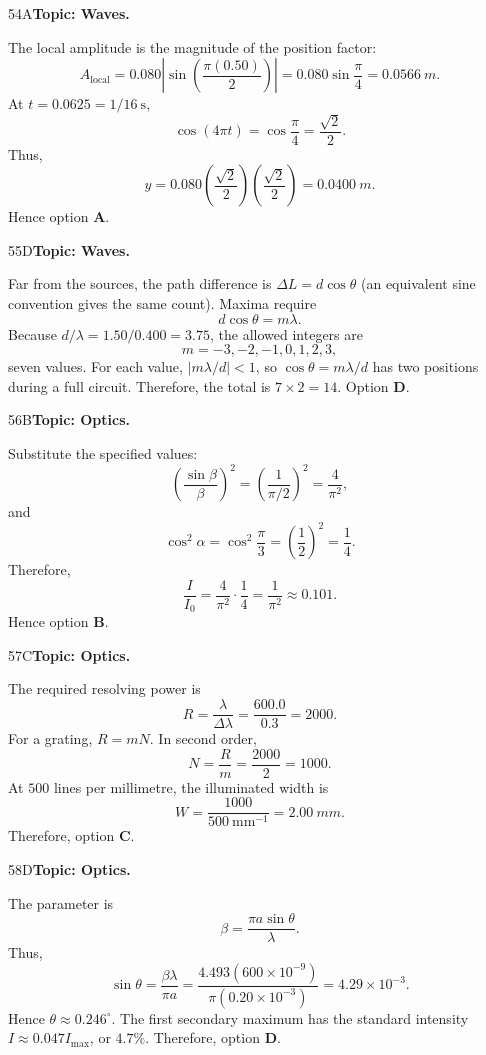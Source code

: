 \documentclass[10pt,a4paper]{physicsquiz}
\begin{document}
\begin{workedsolution}{54}{A}\textbf{Topic: Waves.}\par The local amplitude is the magnitude of the position factor:
  \[
    A_{\mathrm{local}}=0.080\left|\sin\left(\frac{\pi(0.50)}{2}\right)\right|
    =0.080\sin\frac{\pi}{4}
    =\SI{0.0566}{m}.
  \]
  At \(t=0.0625=1/16\ \mathrm{s}\),
  \[
    \cos(4\pi t)=\cos\frac{\pi}{4}=\frac{\sqrt2}{2}.
  \]
  Thus,
  \[
    y=0.080\left(\frac{\sqrt2}{2}\right)\left(\frac{\sqrt2}{2}\right)
    =\SI{0.0400}{m}.
  \]
  Hence option \textbf{A}.\end{workedsolution}
\begin{workedsolution}{55}{D}\textbf{Topic: Waves.}\par Far from the sources, the path difference is \(\Delta L=d\cos\theta\) (an equivalent sine convention gives the same count). Maxima require
  \[
    d\cos\theta=m\lambda.
  \]
  Because \(d/\lambda=1.50/0.400=3.75\), the allowed integers are
  \[
    m=-3,-2,-1,0,1,2,3,
  \]
  seven values. For each value, \(|m\lambda/d|<1\), so \(\cos\theta=m\lambda/d\) has two positions during a full circuit. Therefore, the total is \(7\times2=14\). Option \textbf{D}.\end{workedsolution}
\begin{workedsolution}{56}{B}\textbf{Topic: Optics.}\par Substitute the specified values:
  \[
    {\left(\frac{\sin\beta}{\beta}\right)}^2
    ={\left(\frac{1}{\pi/2}\right)}^2
    =\frac{4}{\pi^2},
  \]
  and
  \[
    \cos^2\alpha=\cos^2\frac{\pi}{3}={\left(\frac12\right)}^2=\frac14.
  \]
  Therefore,
  \[
    \frac{I}{I_0}=\frac{4}{\pi^2}\cdot\frac14=\frac{1}{\pi^2}\approx0.101.
  \]
  Hence option \textbf{B}.\end{workedsolution}
\begin{workedsolution}{57}{C}\textbf{Topic: Optics.}\par The required resolving power is
  \[
    R=\frac{\lambda}{\Delta\lambda}
    =\frac{600.0}{0.3}=2000.
  \]
  For a grating, \(R=mN\). In second order,
  \[
    N=\frac{R}{m}=\frac{2000}{2}=1000.
  \]
  At \(500\) lines per millimetre, the illuminated width is
  \[
    W=\frac{1000}{500\ \mathrm{mm}^{-1}}=\SI{2.00}{mm}.
  \]
  Therefore, option \textbf{C}.\end{workedsolution}
\begin{workedsolution}{58}{D}\textbf{Topic: Optics.}\par The parameter is
  \[
    \beta=\frac{\pi a\sin\theta}{\lambda}.
  \]
  Thus,
  \[
    \sin\theta=\frac{\beta\lambda}{\pi a}
    =\frac{4.493(600\times10^{-9})}{\pi(0.20\times10^{-3})}
    =4.29\times10^{-3}.
  \]
  Hence \(\theta\approx0.246^\circ\). The first secondary maximum has the standard intensity \(I\approx0.047I_{\max}\), or \(4.7\%\). Therefore, option \textbf{D}.\end{workedsolution}
\end{document}
